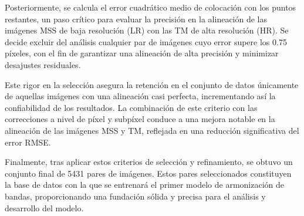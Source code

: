                Posteriormente, se calcula el error cuadrático medio de colocación con los puntos restantes, un paso crítico para evaluar la precisión en la alineación de las imágenes MSS de baja resolución (LR) con las TM de alta resolución (HR). Se decide excluir del análisis cualquier par de imágenes cuyo error supere los 0.75 píxeles, con el fin de garantizar una alineación de alta precisión y minimizar desajustes residuales.
            
                Este rigor en la selección asegura la retención en el conjunto de datos únicamente de aquellas imágenes con una alineación casi perfecta, incrementando así la confiabilidad de los resultados. La combinación de este criterio con las correcciones a nivel de píxel y subpíxel conduce a una mejora notable en la alineación de las imágenes MSS y TM, reflejada en una reducción significativa del error RMSE.
            
                Finalmente, tras aplicar estos criterios de selección y refinamiento, se obtuvo un conjunto final de 5431 pares de imágenes. Estos pares seleccionados constituyen la base de datos con la que se entrenará el primer modelo de armonización de bandas, proporcionando una fundación sólida y precisa para el análisis y desarrollo del modelo.
                


